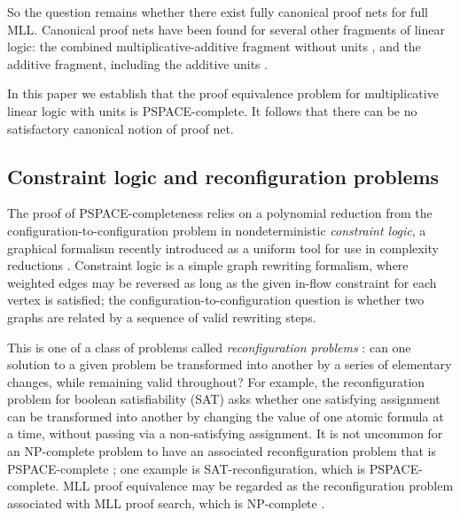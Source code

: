 \documentclass[conference]{IEEEtran}
\let\aftersection=\noindent
\let\capsabbrev=\uppercase
\begin{document}
So the question remains whether there exist fully canonical proof nets for full \capsabbrev{mll}. Canonical proof nets have been found for several other fragments of linear logic: the combined multiplicative-additive fragment without units \cite{Hughes-vanGlabbeek-2005}, and the additive fragment, including the additive units \cite{Heijltjes-2011}.

In this paper we establish that the proof equivalence problem for multiplicative linear logic with units is \capsabbrev{pspace}-complete. It follows that there can be no satisfactory canonical notion of proof net.


\subsection*{Constraint logic and reconfiguration problems}

\aftersection The proof of \capsabbrev{pspace}-completeness relies on a polynomial reduction from the configuration-to-configuration problem in nondeterministic
\emph{constraint logic}, a graphical formalism recently introduced as a uniform tool for use in complexity reductions \cite{Demaine-Hearn-2008}.
%
Constraint logic is a simple graph rewriting formalism, where weighted edges may be reversed as long as the given in-flow constraint for each vertex is satisfied; the configuration-to-configuration question is whether two graphs are related by a sequence of valid rewriting steps.

This is one of a class of problems called \emph{reconfiguration problems} \cite{ReconfigurationProblems}: can one solution to a given problem be transformed into another by a series of elementary changes, while remaining valid throughout?
%
For example, the reconfiguration problem for boolean satisfiability (SAT) asks whether one satisfying assignment can be transformed into another by changing the value of one atomic formula at a time, without passing via a non-satisfying assignment.
%
It is not uncommon for an \capsabbrev{np}-complete problem to have an associated reconfiguration problem that is \capsabbrev{pspace}-complete \cite{ReconfigurationProblems}; one example is SAT-reconfiguration, which is \capsabbrev{pspace}-complete. \capsabbrev{mll} proof equivalence may be regarded as the reconfiguration problem associated with \capsabbrev{mll} proof search, which is \capsabbrev{np}-complete \cite{Kanovich-1992,Lincoln-Winkler-1994}.
\end{document}
